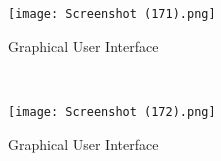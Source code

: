\documentclass[12pt, English]{article}
\begin{document}
\begin{normalsize}
\newpage
\begin{figure}[htb]
\begin{center}
\texttt{[image: Screenshot (171).png]}
\end{center}
\begin{center}
\renewcommand{\thefigure}{6.2.3}
\caption{\footnotesize Graphical User Interface}
\end{center}
\end{figure}\\

\newpage
\begin{figure}[htb]
\begin{center}
\texttt{[image: Screenshot (172).png]}
\end{center}
\begin{center}
\renewcommand{\thefigure}{6.2.4}
\caption{\footnotesize Graphical User Interface}
\end{center}
\end{figure}\\








\end{normalsize}
\end{document}
